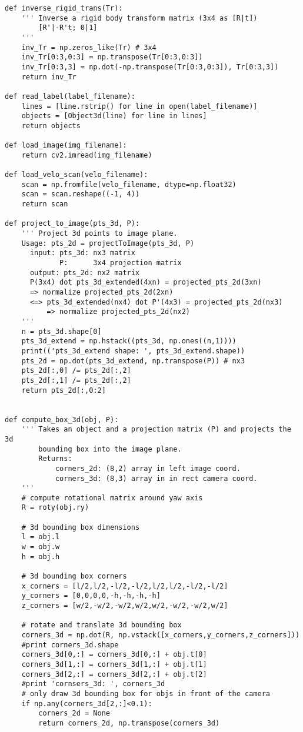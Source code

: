 \begin{lstlisting}
def inverse_rigid_trans(Tr):
    ''' Inverse a rigid body transform matrix (3x4 as [R|t])
        [R'|-R't; 0|1]
    '''
    inv_Tr = np.zeros_like(Tr) # 3x4
    inv_Tr[0:3,0:3] = np.transpose(Tr[0:3,0:3])
    inv_Tr[0:3,3] = np.dot(-np.transpose(Tr[0:3,0:3]), Tr[0:3,3])
    return inv_Tr

def read_label(label_filename):
    lines = [line.rstrip() for line in open(label_filename)]
    objects = [Object3d(line) for line in lines]
    return objects

def load_image(img_filename):
    return cv2.imread(img_filename)

def load_velo_scan(velo_filename):
    scan = np.fromfile(velo_filename, dtype=np.float32)
    scan = scan.reshape((-1, 4))
    return scan

def project_to_image(pts_3d, P):
    ''' Project 3d points to image plane.
    Usage: pts_2d = projectToImage(pts_3d, P)
      input: pts_3d: nx3 matrix
             P:      3x4 projection matrix
      output: pts_2d: nx2 matrix
      P(3x4) dot pts_3d_extended(4xn) = projected_pts_2d(3xn)
      => normalize projected_pts_2d(2xn)
      <=> pts_3d_extended(nx4) dot P'(4x3) = projected_pts_2d(nx3)
          => normalize projected_pts_2d(nx2)
    '''
    n = pts_3d.shape[0]
    pts_3d_extend = np.hstack((pts_3d, np.ones((n,1))))
    print(('pts_3d_extend shape: ', pts_3d_extend.shape))
    pts_2d = np.dot(pts_3d_extend, np.transpose(P)) # nx3
    pts_2d[:,0] /= pts_2d[:,2]
    pts_2d[:,1] /= pts_2d[:,2]
    return pts_2d[:,0:2]


def compute_box_3d(obj, P):
    ''' Takes an object and a projection matrix (P) and projects the 3d
        bounding box into the image plane.
        Returns:
            corners_2d: (8,2) array in left image coord.
            corners_3d: (8,3) array in in rect camera coord.
    '''
    # compute rotational matrix around yaw axis
    R = roty(obj.ry)    

    # 3d bounding box dimensions
    l = obj.l
    w = obj.w
    h = obj.h
    
    # 3d bounding box corners
    x_corners = [l/2,l/2,-l/2,-l/2,l/2,l/2,-l/2,-l/2]
    y_corners = [0,0,0,0,-h,-h,-h,-h]
    z_corners = [w/2,-w/2,-w/2,w/2,w/2,-w/2,-w/2,w/2]
    
    # rotate and translate 3d bounding box
    corners_3d = np.dot(R, np.vstack([x_corners,y_corners,z_corners]))
    #print corners_3d.shape
    corners_3d[0,:] = corners_3d[0,:] + obj.t[0]
    corners_3d[1,:] = corners_3d[1,:] + obj.t[1]
    corners_3d[2,:] = corners_3d[2,:] + obj.t[2]
    #print 'cornsers_3d: ', corners_3d 
    # only draw 3d bounding box for objs in front of the camera
    if np.any(corners_3d[2,:]<0.1):
        corners_2d = None
        return corners_2d, np.transpose(corners_3d)
    

\end{lstlisting}

